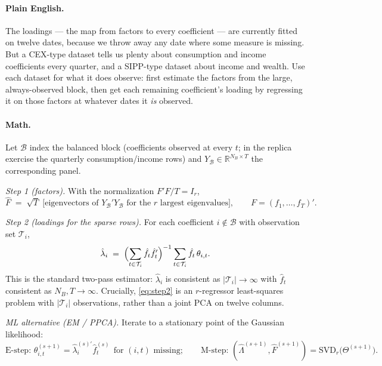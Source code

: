 \documentclass[11pt]{article}
\begin{document}
\paragraph{Plain English.} The loadings --- the map from factors to every
coefficient --- are currently fitted on twelve dates, because we throw away any
date where some measure is missing. But a CEX-type dataset tells us plenty about
consumption and income coefficients every quarter, and a SIPP-type dataset about
income and wealth. Use each dataset for what it does observe: first estimate the
factors from the large, always-observed block, then get each remaining
coefficient's loading by regressing it on those factors at whatever dates it
\emph{is} observed.

\paragraph{Math.} Let $\mathcal{B}$ index the balanced block (coefficients
observed at every $t$; in the replica exercise the quarterly consumption/income
rows) and $Y_\mathcal{B} \in \mathbb{R}^{N_B \times T}$ the corresponding panel.

\emph{Step 1 (factors).} With the normalization $F'F/T = I_r$,
\begin{equation}
  \hat F \;=\; \sqrt{T}\;\bigl[\text{eigenvectors of } Y_\mathcal{B}' Y_\mathcal{B}
              \text{ for the $r$ largest eigenvalues}\bigr],
  \qquad F = (f_1,\ldots,f_T)' .
\end{equation}

\emph{Step 2 (loadings for the sparse rows).} For each coefficient $i \notin
\mathcal{B}$ with observation set $\mathcal{T}_i$,
\begin{equation}
  \hat\lambda_i \;=\;
  \Bigl( \sum_{t \in \mathcal{T}_i} \hat f_t \hat f_t' \Bigr)^{-1}
  \sum_{t \in \mathcal{T}_i} \hat f_t\, \theta_{i,t} .
  \label{eq:step2}
\end{equation}
This is the standard two-pass estimator: $\hat\lambda_i$ is consistent as
$|\mathcal{T}_i| \to \infty$ with $\hat f_t$ consistent as $N_B, T \to \infty$.
Crucially, \eqref{eq:step2} is an $r$-regressor least-squares problem with
$|\mathcal{T}_i|$ observations, rather than a joint PCA on twelve columns.

\emph{ML alternative (EM / PPCA).} Iterate to a stationary point of the Gaussian
likelihood:
\begin{equation}
  \text{E-step: } \theta^{(s+1)}_{i,t} = \hat\lambda_i^{(s)\prime} \hat f^{(s)}_t
  \ \ \text{for } (i,t) \text{ missing};
  \qquad
  \text{M-step: } (\hat\Lambda^{(s+1)}, \hat F^{(s+1)}) = \mathrm{SVD}_r\bigl(\Theta^{(s+1)}\bigr).
\end{equation}
\end{document}
